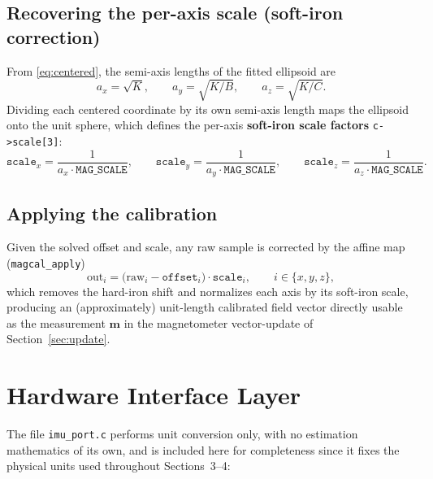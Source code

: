 \documentclass[11pt]{article}
\newcommand{\vect}[1]{\bm{#1}}
\begin{document}
\subsection{Recovering the per-axis scale (soft-iron correction)}

From \eqref{eq:centered}, the semi-axis lengths of the fitted ellipsoid are
\begin{equation}
a_x = \sqrt{K}, \qquad a_y = \sqrt{K/B}, \qquad a_z = \sqrt{K/C}.
\end{equation}
Dividing each centered coordinate by its own semi-axis length maps the ellipsoid onto the unit sphere, which defines the per-axis \textbf{soft-iron scale factors} \texttt{c->scale[3]}:
\begin{equation}
\texttt{scale}_x = \frac{1}{a_x \cdot \texttt{MAG\_SCALE}}, \qquad
\texttt{scale}_y = \frac{1}{a_y \cdot \texttt{MAG\_SCALE}}, \qquad
\texttt{scale}_z = \frac{1}{a_z \cdot \texttt{MAG\_SCALE}} .
\label{eq:scale}
\end{equation}

\subsection{Applying the calibration}

Given the solved offset and scale, any raw sample is corrected by the affine map (\texttt{magcal\_apply})
\begin{equation}
\text{out}_i = \big(\text{raw}_i - \texttt{offset}_i\big) \cdot \texttt{scale}_i, \qquad i \in \{x,y,z\},
\label{eq:apply}
\end{equation}
which removes the hard-iron shift and normalizes each axis by its soft-iron scale, producing an (approximately) unit-length calibrated field vector directly usable as the measurement $\vect m$ in the magnetometer vector-update of Section~\ref{sec:update}.

\section{Hardware Interface Layer}
\label{sec:port}

The file \texttt{imu\_port.c} performs unit conversion only, with no estimation mathematics of its own, and is included here for completeness since it fixes the physical units used throughout Sections~3--4:
\end{document}
